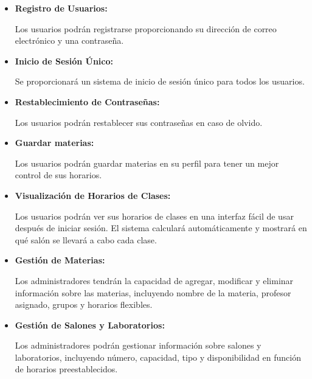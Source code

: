 \begin{itemize}

        \item {
              \textbf{Registro de Usuarios:}

              Los usuarios podrán registrarse proporcionando su dirección de correo electrónico y una contraseña.
              }

        \item {

              \textbf{Inicio de Sesión Único:}

              Se proporcionará un sistema de inicio de sesión único para todos los usuarios.
              }

        \item {
              \textbf{Restablecimiento de Contraseñas:}

              Los usuarios podrán restablecer sus contraseñas en caso de olvido.
              }

        \item {
              \textbf{Guardar materias:}

              Los usuarios podrán guardar materias en su perfil para tener un mejor control de sus horarios.
              }

        \item {
              \textbf{Visualización de Horarios de Clases:}

              Los usuarios podrán ver sus horarios de clases en una interfaz fácil de usar después de iniciar sesión.
              El sistema calculará automáticamente y mostrará en qué salón se llevará a cabo cada clase.
              }

        \item {
              \textbf{Gestión de Materias:}

              Los administradores tendrán la capacidad de agregar, modificar y eliminar información sobre las materias, incluyendo nombre de la materia, profesor asignado, grupos y horarios flexibles.
              }

        \item {
              \textbf{Gestión de Salones y Laboratorios:}

              Los administradores podrán gestionar información sobre salones y laboratorios, incluyendo número, capacidad, tipo y disponibilidad en función de horarios preestablecidos.
              }

\end{itemize}

